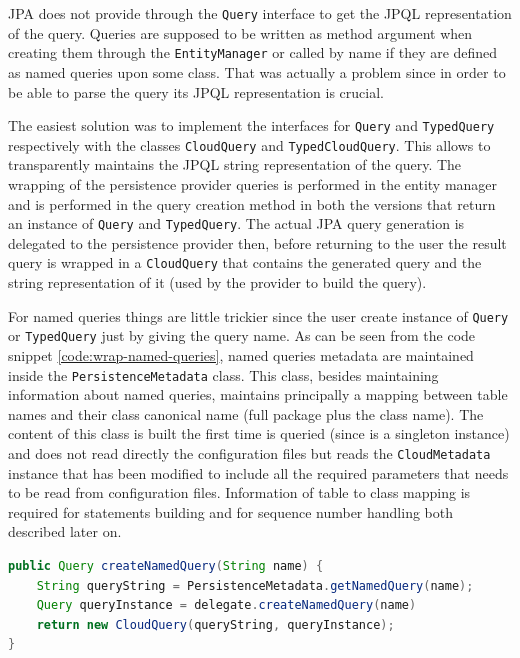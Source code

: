 \newparagraph JPA does not provide through the \texttt{Query} interface to get the JPQL representation of the query. Queries are supposed to be written as method argument when creating them through the \texttt{EntityManager} or called by name if they are defined as named queries upon some class.
That was actually a problem since in order to be able to parse the query its JPQL representation is crucial.

\noindent The easiest solution was to implement the interfaces for \texttt{Query} and \texttt{TypedQuery} respectively with the classes \texttt{CloudQuery} and \texttt{TypedCloudQuery}. This allows to transparently maintains the JPQL string representation of the query.
The wrapping of the persistence provider queries is performed in the entity manager and is performed in the query creation method  in both the versions that return an instance of \texttt{Query} and \texttt{TypedQuery}. The actual JPA query generation is delegated to the persistence provider then, before returning to the user the result query is wrapped in a \texttt{CloudQuery} that contains the generated query and the string representation of it (used by the provider to build the query).

\newparagraph For named queries things are little trickier since the user create instance of \texttt{Query} or \texttt{TypedQuery} just by giving the query name.
\noindent As can be seen from the code snippet \ref{code:wrap-named-queries}, named queries metadata are maintained inside the \texttt{PersistenceMetadata} class. This class, besides maintaining information about named queries, maintains principally a mapping between table names and their class canonical name (full package plus the class name). The content of this class is built the first time is queried (since is a singleton instance) and does not read directly the  configuration files but reads the \texttt{CloudMetadata} instance that has been modified to include all the required parameters that needs to be read from configuration files. 
Information of table to class mapping is required for statements building and for sequence number handling both described later on.

\begin{lstlisting}[language=Java, caption=Wrap named queries, label=code:wrap-named-queries]
public Query createNamedQuery(String name) {
    String queryString = PersistenceMetadata.getNamedQuery(name);
    Query queryInstance = delegate.createNamedQuery(name)
    return new CloudQuery(queryString, queryInstance);
}
\end{lstlisting}


